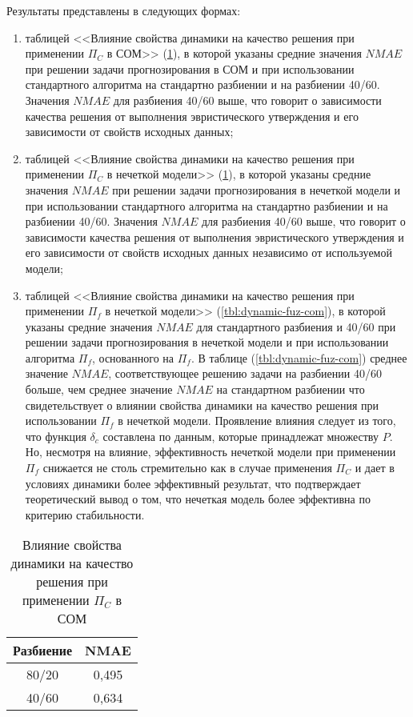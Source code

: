 Результаты представлены в следующих формах:
\begin{enumerate}
	\item таблицей <<Влияние свойства динамики на качество решения при применении
	$\Pi_C$ в СОМ>> (\ref{tbl:dynamic-com}), в которой указаны
	средние значения $NMAE$ при решении задачи прогнозирования
	в СОМ и при использовании стандартного алгоритма
	на стандартно разбиении и на разбиении 40/60. Значения
	$NMAE$ для разбиения 40/60 выше, что говорит о зависимости
	качества решения от выполнения эвристического утверждения и его
		зависимости от свойств исходных данных;

	\item таблицей <<Влияние свойства динамики на качество решения при применении
	$\Pi_C$ в нечеткой модели>> (\ref{tbl:dynamic-com}), в которой указаны
	средние значения $NMAE$ при решении задачи прогнозирования
	в нечеткой модели и при использовании стандартного алгоритма
	на стандартно разбиении и на разбиении 40/60. Значения
	$NMAE$ для разбиения 40/60 выше, что говорит о зависимости
	качества решения от выполнения эвристического утверждения и его
	зависимости от свойств исходных данных независимо от используемой модели;

	\item таблицей <<Влияние свойства динамики на качество решения при применении
	$\Pi_f$ в нечеткой модели>> (\ref{tbl:dynamic-fuz-com}), в которой указаны
	средние значения $NMAE$ для стандартного разбиения и 40/60
	при решении задачи прогнозирования в нечеткой модели и при использовании
	алгоритма $\Pi_f$, основанного на $\Pi_f$.
	В таблице (\ref{tbl:dynamic-fuz-com}) среднее значение $NMAE$, соответствующее
	решению задачи на разбиении 40/60 больше, чем среднее значение $NMAE$
	на стандартном разбиении
	что свидетельствует о влиянии свойства динамики на качество решения
	при использовании $\Pi_f$ в нечеткой модели. Проявление влияния следует из
	того, что функция $\delta_c$ составлена по данным, которые принадлежат
	множеству $P$. Но, несмотря на влияние, эффективность нечеткой модели
	при применении $\Pi_f$
	снижается не столь стремительно как в случае применения $\Pi_C$
	и дает в условиях динамики более эффективный результат,
	что подтверждает теоретический вывод о том, что нечеткая
	модель более эффективна по критерию стабильности.
\end{enumerate}

\begin{table}[h]
	\caption{Влияние свойства динамики на качество решения при применении
	$\Pi_C$ в СОМ}
  \begin{center}
	\label{tbl:dynamic-com}
	\begin{tabular}{|c|c|}
	  \hline
		Разбиение & NMAE \\ \hline
		80/20 & 0,495 \\ \hline
		40/60 & 0,634 \\ \hline
	\end{tabular}
  \end{center}
\end{table}

